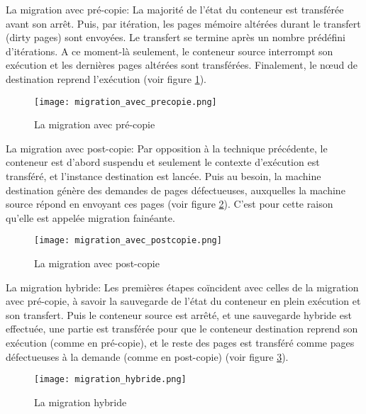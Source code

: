 La migration avec pré-copie: La majorité de l'état du conteneur est transférée avant son arrêt. Puis, par itération, les pages mémoire altérées durant le transfert (dirty pages) sont envoyées. Le transfert se termine après un nombre prédéfini d'itérations. A ce moment-là seulement, le conteneur source interrompt son exécution et les dernières pages altérées sont transférées. Finalement, le nœud de destination reprend l'exécution (voir figure \ref{fig:migration_avec_precopie}).\par
\begin{figure}[H]
\centering
\texttt{[image: migration\_avec\_precopie.png]}
\caption{La migration avec pré-copie}
\label{fig:migration_avec_precopie}
\end{figure}
La migration avec post-copie: Par opposition à la technique précédente, le conteneur est d'abord suspendu et seulement le contexte d'exécution est transféré, et l'instance destination est lancée. Puis au besoin, la machine destination génère des demandes de pages défectueuses, auxquelles la machine source répond en envoyant ces pages (voir figure \ref{fig:migration_avec_postcopie}). C'est pour cette raison qu'elle est appelée migration fainéante.\par
\begin{figure}[H]
\centering
\texttt{[image: migration\_avec\_postcopie.png]}
\caption{La migration avec post-copie}
\label{fig:migration_avec_postcopie}
\end{figure}
La migration hybride: Les premières étapes coïncident avec celles de la migration avec pré-copie, à savoir la sauvegarde de l'état du conteneur en plein exécution et son transfert. Puis le conteneur source est arrêté, et une sauvegarde hybride est effectuée, une partie est transférée pour que le conteneur destination reprend son exécution (comme en pré-copie), et le reste des pages est transféré comme pages défectueuses à la demande (comme en post-copie) (voir figure \ref{fig:migration_hybride}).
\begin{figure}[H]
\centering
\texttt{[image: migration\_hybride.png]}
\caption{La migration hybride}
\label{fig:migration_hybride}
\end{figure}

